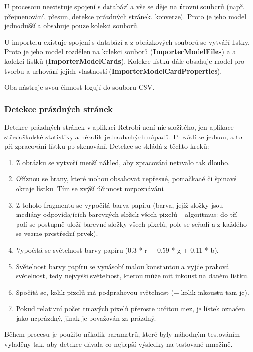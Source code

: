 U procesoru neexistuje spojení s databází a vše se děje na úrovni souborů (např. přejmenování, přesun, detekce prázdných stránek, konverze). Proto je jeho model jednodušší a obsahuje pouze kolekci souborů. 

U importeru existuje spojení s databází a z obrázkových souborů se vytváří lístky. Proto je jeho model rozdělen na kolekci souborů ({\bf ImporterModelFiles}) a a kolekci lístků ({\bf ImporterModelCards}). Kolekce lístků dále obsahuje model pro tvorbu a uchování jejich vlastností ({\bf ImporterModelCardProperties}). 

Oba nástroje svou činnost logují do souboru CSV.

\subsubsection{Detekce prázdných stránek}

Detekce prázdných stránek v aplikaci Retrobi není nic složitého, jen aplikace středoškolské statistiky a několik jednoduchých nápadů. Provádí se jednou, a to při zpracování lístku po skenování. Detekce se skládá z těchto kroků:

\begin{enumerate}
\item{Z obrázku se vytvoří menší náhled, aby zpracování netrvalo tak dlouho.}
\item{Oříznou se hrany, které mohou obsahovat nepřesné, pomačkané či špinavé okraje lístku. Tím se zvýší účinnost rozpoznávání.}
\item{Z tohoto fragmentu se vypočítá barva papíru (barva, jejíž složky jsou mediány odpovídajících barevných složek všech pixelů -- algoritmus: do tří polí se postupně uloží barevné složky všech pixelů, pole se seřadí a z každého se vezme prostřední prvek).}
\item{Vypočítá se světelnost barvy papíru (0.3 * r + 0.59 * g + 0.11 * b).}
\item{Světelnost barvy papíru se vynásobí malou konstantou a vyjde prahová světelnost, tedy nejvyšší světelnost, kterou může mít inkoust na daném lístku.}
\item{Spočítá se, kolik pixelů má podprahovou světelnost (= kolik inkoustu tam je).}
\item{Pokud relativní počet tmavých pixelů přeroste určitou mez, je lístek označen jako neprázdný, jinak je považován za prázdný.}
\end{enumerate}

Během procesu je použito několik parametrů, které byly náhodným testováním vyladěny tak, aby detekce dávala co nejlepší výsledky na testované množině.

